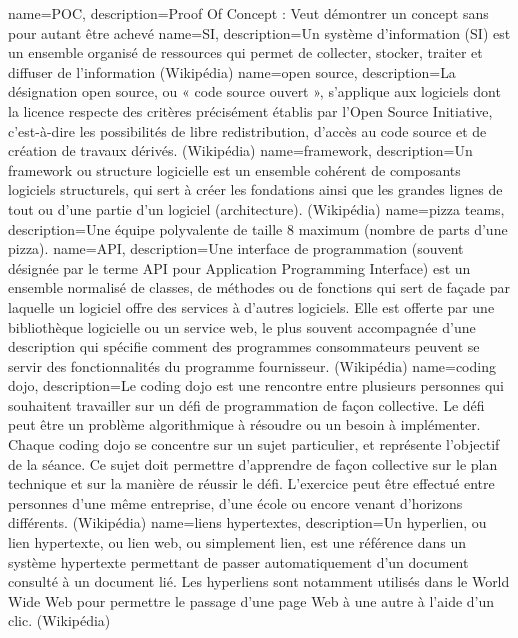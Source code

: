 {
  name=POC,
  description={Proof Of Concept : Veut démontrer un concept sans pour autant être achevé}
}
{
    name=SI,
    description={Un système d'information (SI) est un ensemble organisé de ressources qui permet de collecter, stocker, traiter et diffuser de l'information (Wikipédia)}
}
{
  name=open source,
  description={La désignation open source, ou « code source ouvert », s'applique aux logiciels dont la licence respecte des critères précisément établis par l'Open Source Initiative, c'est-à-dire les possibilités de libre redistribution, d'accès au code source et de création de travaux dérivés. (Wikipédia)}
}
{
  name=framework,
  description={Un framework ou structure logicielle est un ensemble cohérent de composants logiciels structurels, qui sert à créer les fondations ainsi que les grandes lignes de tout ou d’une partie d'un logiciel (architecture). (Wikipédia)}
}
{
  name=pizza teams,
  description={Une équipe polyvalente de taille 8 maximum (nombre de parts d'une pizza).}
}
{
  name=API,
  description={Une interface de programmation (souvent désignée par le terme API pour Application Programming Interface) est un ensemble normalisé de classes, de méthodes ou de fonctions qui sert de façade par laquelle un logiciel offre des services à d'autres logiciels. Elle est offerte par une bibliothèque logicielle ou un service web, le plus souvent accompagnée d'une description qui spécifie comment des programmes consommateurs peuvent se servir des fonctionnalités du programme fournisseur. (Wikipédia)}
}
{
  name=coding dojo,
  description={Le coding dojo est une rencontre entre plusieurs personnes qui souhaitent travailler sur un défi de programmation de façon collective. Le défi peut être un problème algorithmique à résoudre ou un besoin à implémenter. Chaque coding dojo se concentre sur un sujet particulier, et représente l'objectif de la séance. Ce sujet doit permettre d'apprendre de façon collective sur le plan technique et sur la manière de réussir le défi. L'exercice peut être effectué entre personnes d'une même entreprise, d'une école ou encore venant d'horizons différents. (Wikipédia)}
}
{
  name=liens hypertextes,
  description={Un hyperlien, ou lien hypertexte, ou lien web, ou simplement lien, est une référence dans un système hypertexte permettant de passer automatiquement d'un document consulté à un document lié. Les hyperliens sont notamment utilisés dans le World Wide Web pour permettre le passage d'une page Web à une autre à l'aide d'un clic. (Wikipédia)}
}
